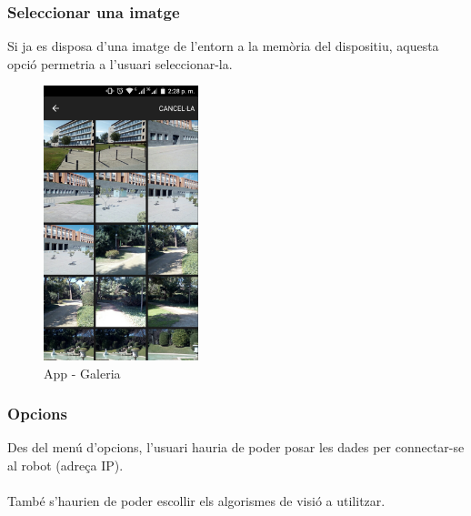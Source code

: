 	\subsubsection{Seleccionar una imatge}
	Si ja es disposa d'una imatge de l'entorn a la memòria del dispositiu, aquesta opció permetria a l'usuari seleccionar-la.
		\begin{figure}[H]
			\centering
			\includegraphics[width=0.4\textwidth]{images/gallery}
			\caption{App - Galeria}
		\end{figure}
	\subsubsection{Opcions}
		Des del menú d'opcions, l'usuari hauria de poder posar les dades per connectar-se al robot (adreça IP).\\\\
		També s'haurien de poder escollir els algorismes de visió a utilitzar.
		
